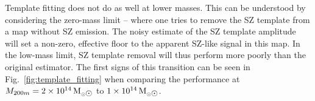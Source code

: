 Template fitting does not do as well at lower masses. 
This can be understood by considering  the zero-mass limit -- where one tries to remove the SZ template from a map without SZ emission. 
The noisy estimate of the SZ template amplitude will set a non-zero, effective floor to the apparent SZ-like signal in this map. 
In the low-mass limit, SZ template removal will thus perform more poorly than the original estimator. 
The first signs of this transition can be seen in Fig.~\ref{fig:template_fitting} when comparing the performance at $\mvir = 2\times 10^{14}\,\msolar$ to   $1\times 10^{14}\,\msolar$.


 
 



 

